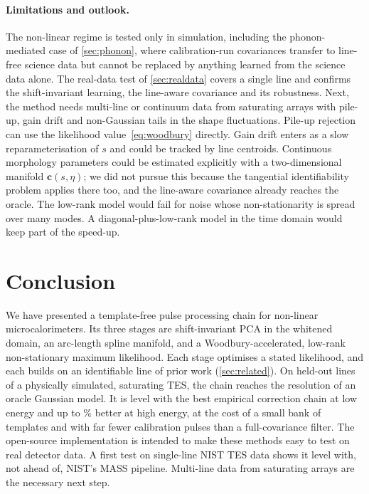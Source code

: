 \documentclass[aps,prapplied,reprint,superscriptaddress,longbibliography,nofootinbib]{revtex4-2}
\theoremstyle{remark}
\newcommand{\vect}[1]{\bm{#1}}
\begin{document}
\paragraph{Limitations and outlook.} The non-linear regime is tested only in
simulation, including the phonon-mediated case of \cref{sec:phonon}, where
calibration-run covariances transfer to line-free science data but cannot be
replaced by anything learned from the science data alone. The real-data test of \cref{sec:realdata} covers a single line and
confirms the shift-invariant learning, the line-aware covariance and its
robustness. Next, the method needs multi-line or continuum data from saturating
arrays with pile-up, gain drift and non-Gaussian tails in the shape fluctuations. Pile-up rejection can use the likelihood
value~\eqref{eq:woodbury} directly. Gain drift enters as a slow reparameterisation
of $s$ and could be tracked by line centroids. Continuous morphology parameters
could be estimated explicitly with a two-dimensional manifold
$\vect c(s,\eta)$; we did not pursue this because the tangential identifiability
problem applies there too, and the line-aware covariance already reaches the oracle.
The low-rank model would fail for noise whose non-stationarity is spread over many
modes. A diagonal-plus-low-rank model in the time domain would keep part of the
speed-up.

\section{Conclusion}
We have presented a template-free pulse processing chain for non-linear
microcalorimeters. Its three stages are shift-invariant PCA in the whitened domain,
an arc-length spline manifold, and a Woodbury-accelerated, low-rank non-stationary
maximum likelihood. Each stage optimises a stated likelihood, and each builds on an
identifiable line of prior work (\cref{sec:related}). On held-out lines of a
physically simulated, saturating TES, the chain reaches the resolution of an oracle
Gaussian model. It is level with the best empirical correction chain at low energy
and up to \impBestTopMorph\% better at high energy, at the cost of a small bank of
templates and with far fewer calibration pulses than a full-covariance filter. The
open-source implementation is intended to make these methods easy to test on real
detector data. A first test on single-line NIST TES data shows it level with, not ahead
of, NIST's MASS pipeline. Multi-line data from saturating arrays are the
necessary next step.
\end{document}
